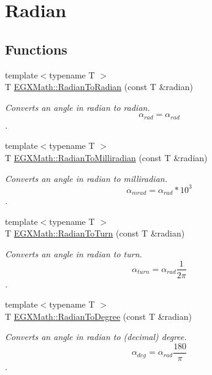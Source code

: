 \hypertarget{group___e_g_x_math-_angle_conversions-_radian}{}\section{Radian}
\label{group___e_g_x_math-_angle_conversions-_radian}
\subsection*{Functions}
\begin{DoxyCompactItemize}
\item 
{\footnotesize template$<$typename T $>$ }\\T \mbox{\hyperlink{group___e_g_x_math-_angle_conversions-_radian_gae08681bd86b8e7e4325f6c8cb3a0dc37}{E\+G\+X\+Math\+::\+Radian\+To\+Radian}} (const T \&radian)
\begin{DoxyCompactList}\small\item\em Converts an angle in radian to radian. \[\alpha_{rad}=\alpha_{rad}\]. \end{DoxyCompactList}\item 
{\footnotesize template$<$typename T $>$ }\\T \mbox{\hyperlink{group___e_g_x_math-_angle_conversions-_radian_gaea391f0cca39b05e298dd1cae162e7f1}{E\+G\+X\+Math\+::\+Radian\+To\+Milliradian}} (const T \&radian)
\begin{DoxyCompactList}\small\item\em Converts an angle in radian to milliradian. \[\alpha_{mrad}=\alpha_{rad}*10^3\]. \end{DoxyCompactList}\item 
{\footnotesize template$<$typename T $>$ }\\T \mbox{\hyperlink{group___e_g_x_math-_angle_conversions-_radian_ga8492d6d2f6467c619b65e5fb75a9ae04}{E\+G\+X\+Math\+::\+Radian\+To\+Turn}} (const T \&radian)
\begin{DoxyCompactList}\small\item\em Converts an angle in radian to turn. \[\alpha_{turn}=\alpha_{rad}\frac{1}{2 \pi}\]. \end{DoxyCompactList}\item 
{\footnotesize template$<$typename T $>$ }\\T \mbox{\hyperlink{group___e_g_x_math-_angle_conversions-_radian_ga25bbce6cdc1c3621f2a158d320e3bc45}{E\+G\+X\+Math\+::\+Radian\+To\+Degree}} (const T \&radian)
\begin{DoxyCompactList}\small\item\em Converts an angle in radian to (decimal) degree. \[\alpha_{deg}=\alpha_{rad}\frac{180}{\pi}\]. \end{DoxyCompactList}\item 

\end{DoxyCompactItemize}
